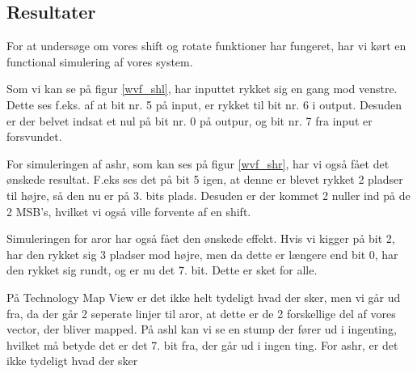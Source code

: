 \documentclass[../journal2.tex]{subfiles}
\begin{document}
\begin{table}[H]
    \centering
      \framebox{
        \rule{8pt}{0pt}
          
  }
  \caption{Architecture af shift\textunderscore div}
  \label{src:shift_div2}
\end{table}


\subsection{Resultater}

For at undersøge om vores shift og rotate funktioner har fungeret, har vi kørt en functional simulering af vores system. \par

Som vi kan se på figur \ref{wvf_shl}, har inputtet rykket sig en gang mod venstre. Dette ses f.eks. af at bit nr. 5 på input, er rykket til bit nr. 6 i output. Desuden er der belvet indsat et nul på bit nr. 0 på outpur, og bit nr. 7 fra input er forsvundet.


For simuleringen af a\textunderscore shr, som kan ses på figur \ref{wvf_shr}, har vi også fået det ønskede resultat. F.eks ses det på bit 5 igen, at denne er blevet rykket 2 pladser til højre, så den nu er på 3. bits plads. Desuden er der kommet 2 nuller ind på de 2 MSB's, hvilket vi også ville forvente af en shift.


Simuleringen for a\textunderscore ror har også fået den ønskede effekt. Hvis vi kigger på bit 2, har den rykket sig 3 pladser mod højre, men da dette er længere end bit 0, har den rykket sig rundt, og er nu det 7. bit. Dette er sket for alle.


På Technology Map View er det ikke helt tydeligt hvad der sker, men vi går ud fra, da der går 2 seperate linjer til a\textunderscore ror, at dette er de 2 forskellige del af vores vector, der bliver mapped. På a\textunderscore shl kan vi se en stump der fører ud i ingenting, hvilket må betyde det er det 7. bit fra, der går ud i ingen ting. For a\textunderscore shr, er det ikke tydeligt hvad der sker

\end{document}
